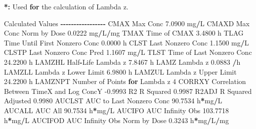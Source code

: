 \documentclass[
  10pt,
]{krantz}
\makeatletter
\newenvironment{Shaded}{\begin{snugshade}}{\end{snugshade}}
\newcommand{\ControlFlowTok}[1]{\textcolor[rgb]{0.13,0.29,0.53}{\textbf{#1}}}
\newcommand{\DecValTok}[1]{\textcolor[rgb]{0.00,0.00,0.81}{#1}}
\newcommand{\ErrorTok}[1]{\textcolor[rgb]{0.64,0.00,0.00}{\textbf{#1}}}
\newcommand{\FloatTok}[1]{\textcolor[rgb]{0.00,0.00,0.81}{#1}}
\newcommand{\NormalTok}[1]{#1}
\newcommand{\OperatorTok}[1]{\textcolor[rgb]{0.81,0.36,0.00}{\textbf{#1}}}
\newcommand{\StringTok}[1]{\textcolor[rgb]{0.31,0.60,0.02}{#1}}
\newenvironment{kframe}{%
\medskip{}
\setlength{\fboxsep}{.8em}
 \def\at@end@of@kframe{}%
 \ifinner\ifhmode%
  \def\at@end@of@kframe{\end{minipage}}%
  \begin{minipage}{\columnwidth}%
 \fi\fi%
 \def\FrameCommand##1{\hskip\@totalleftmargin \hskip-\fboxsep
 \colorbox{shadecolor}{##1}\hskip-\fboxsep
     \hskip-\linewidth \hskip-\@totalleftmargin \hskip\columnwidth}%
 \MakeFramed {\advance\hsize-\width
   \@totalleftmargin\z@ \linewidth\hsize
   \@setminipage}}%
 {\par\unskip\endMakeFramed%
 \at@end@of@kframe}
\renewenvironment{Shaded}{\begin{kframe}}{\end{kframe}}
\makeatother
\begin{document}
\begin{Shaded}
\begin{Highlighting}[]
\OperatorTok{*}\ErrorTok{:}\StringTok{ }\NormalTok{Used }\ControlFlowTok{for}\NormalTok{ the calculation of Lambda z.}


\NormalTok{Calculated Values}
\OperatorTok{{-}{-}{-}{-}{-}{-}{-}{-}{-}{-}{-}{-}{-}{-}{-}{-}{-}}
\NormalTok{CMAX       Max Conc                                        }\FloatTok{7.0900}\NormalTok{ mg}\OperatorTok{/}\NormalTok{L}
\NormalTok{CMAXD      Max Conc Norm by Dose                           }\FloatTok{0.0222}\NormalTok{ mg}\OperatorTok{/}\NormalTok{L}\OperatorTok{/}\NormalTok{mg}
\NormalTok{TMAX       Time of CMAX                                    }\FloatTok{3.4800}\NormalTok{ h}
\NormalTok{TLAG       Time Until First Nonzero Conc                   }\FloatTok{0.0000}\NormalTok{ h}
\NormalTok{CLST       Last Nonzero Conc                               }\FloatTok{1.1500}\NormalTok{ mg}\OperatorTok{/}\NormalTok{L}
\NormalTok{CLSTP      Last Nonzero Conc Pred                          }\FloatTok{1.1607}\NormalTok{ mg}\OperatorTok{/}\NormalTok{L}
\NormalTok{TLST       Time of Last Nonzero Conc                      }\FloatTok{24.2200}\NormalTok{ h}
\NormalTok{LAMZHL     Half}\OperatorTok{{-}}\NormalTok{Life Lambda z                              }\FloatTok{7.8467}\NormalTok{ h}
\NormalTok{LAMZ       Lambda z                                        }\FloatTok{0.0883} \OperatorTok{/}\NormalTok{h}
\NormalTok{LAMZLL     Lambda z Lower Limit                            }\FloatTok{6.9800}\NormalTok{ h}
\NormalTok{LAMZUL     Lambda z Upper Limit                           }\FloatTok{24.2200}\NormalTok{ h}
\NormalTok{LAMZNPT    Number of Points }\ControlFlowTok{for}\NormalTok{ Lambda z                   }\DecValTok{4}
\NormalTok{CORRXY     Correlation Between TimeX and Log ConcY        }\FloatTok{{-}0.9993} 
\NormalTok{R2         R Squared                                       }\FloatTok{0.9987} 
\NormalTok{R2ADJ      R Squared Adjusted                              }\FloatTok{0.9980} 
\NormalTok{AUCLST     AUC to Last Nonzero Conc                       }\FloatTok{90.7534}\NormalTok{ h}\OperatorTok{*}\NormalTok{mg}\OperatorTok{/}\NormalTok{L}
\NormalTok{AUCALL     AUC All                                        }\FloatTok{90.7534}\NormalTok{ h}\OperatorTok{*}\NormalTok{mg}\OperatorTok{/}\NormalTok{L}
\NormalTok{AUCIFO     AUC Infinity Obs                              }\FloatTok{103.7718}\NormalTok{ h}\OperatorTok{*}\NormalTok{mg}\OperatorTok{/}\NormalTok{L}
\NormalTok{AUCIFOD    AUC Infinity Obs Norm by Dose                   }\FloatTok{0.3243}\NormalTok{ h}\OperatorTok{*}\NormalTok{mg}\OperatorTok{/}\NormalTok{L}\OperatorTok{/}\NormalTok{mg}

\end{Highlighting}
\end{Shaded}
\end{document}
